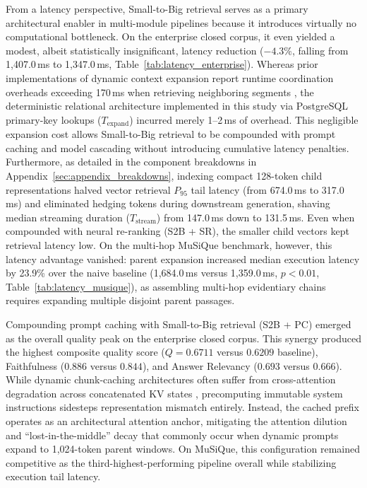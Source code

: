 From a latency perspective, Small-to-Big retrieval serves as a primary architectural enabler in multi-module pipelines because it introduces virtually no computational bottleneck. On the enterprise closed corpus, it even yielded a modest, albeit statistically insignificant, latency reduction ($-4.3\%$, falling from 1,407.0\,ms to 1,347.0\,ms, Table~\ref{tab:latency_enterprise}). Whereas prior implementations of dynamic context expansion report runtime coordination overheads exceeding 170\,ms when retrieving neighboring segments \citep{lumer2025rethinking}, the deterministic relational architecture implemented in this study via PostgreSQL primary-key lookups ($T_{\text{expand}}$) incurred merely 1--2\,ms of overhead. This negligible expansion cost allows Small-to-Big retrieval to be compounded with prompt caching and model cascading without introducing cumulative latency penalties. Furthermore, as detailed in the component breakdowns in Appendix~\ref{sec:appendix_breakdowns}, indexing compact 128-token child representations halved vector retrieval $P_{95}$ tail latency (from 674.0\,ms to 317.0\,ms) and eliminated hedging tokens during downstream generation, shaving median streaming duration ($T_{\text{stream}}$) from 147.0\,ms down to 131.5\,ms. Even when compounded with neural re-ranking (S2B + SR), the smaller child vectors kept retrieval latency low. On the multi-hop MuSiQue benchmark, however, this latency advantage vanished: parent expansion increased median execution latency by 23.9\% over the naive baseline (1,684.0\,ms versus 1,359.0\,ms, $p < 0.01$, Table~\ref{tab:latency_musique}), as assembling multi-hop evidentiary chains requires expanding multiple disjoint parent passages.

Compounding prompt caching with Small-to-Big retrieval (S2B + PC) emerged as the overall quality peak on the enterprise closed corpus. This synergy produced the highest composite quality score ($Q = 0.6711$ versus $0.6209$ baseline), Faithfulness ($0.886$ versus $0.844$), and Answer Relevancy ($0.693$ versus $0.666$). While dynamic chunk-caching architectures often suffer from cross-attention degradation across concatenated KV states \citep{yao2025cacheblend, wang2026fusionrag}, precomputing immutable system instructions sidesteps representation mismatch entirely. Instead, the cached prefix operates as an architectural attention anchor, mitigating the attention dilution and ``lost-in-the-middle'' decay \citep{liu2024lost} that commonly occur when dynamic prompts expand to 1,024-token parent windows. On MuSiQue, this configuration remained competitive as the third-highest-performing pipeline overall while stabilizing execution tail latency.

